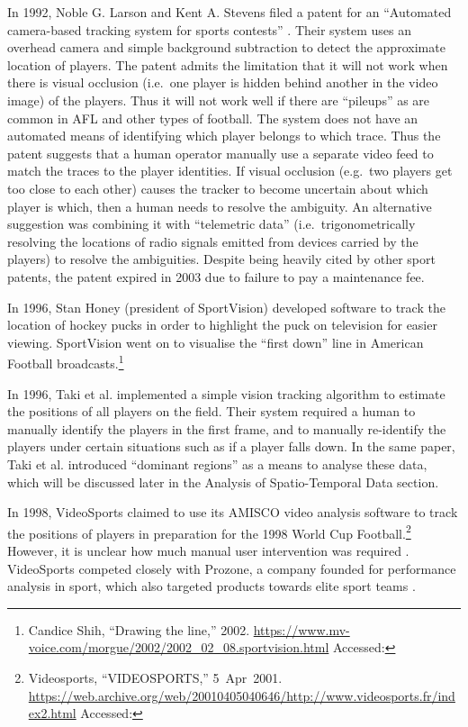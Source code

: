 In 1992, Noble G. Larson and Kent A. Stevens filed a patent for an
``Automated camera-based tracking system for sports contests''
\cite{Larson1994}. Their system uses an overhead camera and
simple background subtraction to detect the approximate location
of players. The patent admits the limitation that it will not work when
there is visual occlusion (i.e.~one player is hidden behind another in
the video image) of the players. Thus it will not work well if there are
``pileups'' as are common in AFL and other types of football. The system
does not have an automated means of identifying which player belongs to
which trace. Thus the patent suggests that a human operator manually use a
separate video feed to match the traces to the player identities. If
visual occlusion (e.g.~two players get too close to each other) causes
the tracker to become uncertain about which player is which, then a
human needs to resolve the ambiguity. An alternative suggestion was
combining it with ``telemetric data'' (i.e.~trigonometrically resolving the
locations of radio signals emitted from devices carried by the players)
to resolve the ambiguities. Despite being heavily cited by other sport
patents, the patent expired in 2003 due to failure to pay a maintenance
fee.

In 1996, Stan Honey (president of SportVision) developed software to
track the location of hockey pucks in order to highlight the puck on
television for easier viewing. SportVision went on to visualise the ``first
down'' line in American Football broadcasts.\footnote{Candice Shih,
  ``Drawing the line,'' 2002.
  \url{https://www.mv-voice.com/morgue/2002/2002_02_08.sportvision.html} Accessed:
  }

In 1996, Taki et al. \cite{Taki1996} implemented a simple
vision tracking algorithm to estimate the positions of all players on
the field. Their system required a human to manually identify the
players in the first frame, and to manually re-identify the players
under certain situations such as if a player falls down. In the same
paper, Taki et al. introduced ``dominant regions'' as a means to analyse these data,
which will be discussed later in the Analysis of Spatio-Temporal Data section.

In 1998, VideoSports claimed to use its AMISCO video analysis software
to track the positions of players in preparation for the 1998 World Cup
Football.\footnote{Videosports, ``VIDEOSPORTS,'' 5~Apr~2001.
  \url{https://web.archive.org/web/20010405040646/http://www.videosports.fr/index2.html}
  Accessed: } However, it is unclear how much manual user
intervention was required \cite{Baca2008}. VideoSports
competed closely with Prozone, a company founded for performance
analysis in sport, which also targeted products towards elite sport
teams \cite{Setterwall2003}.

